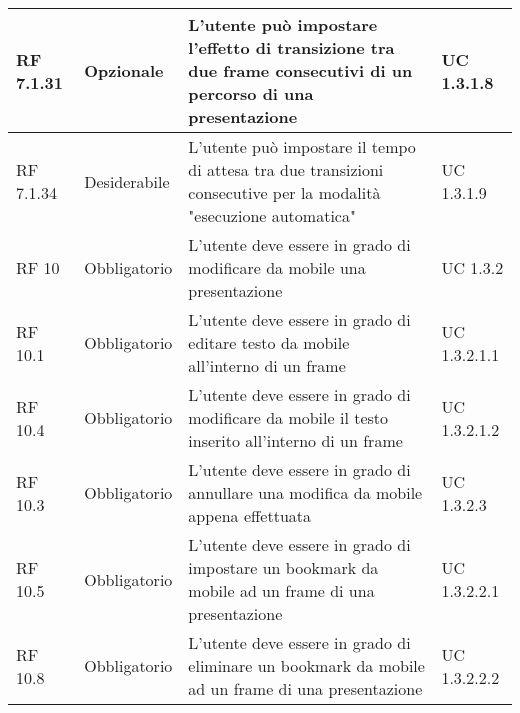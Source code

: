 {\begin{longtable} [c]{| p{2.5cm} | p{2.5cm} | p{6cm} |p{2.5cm}|}
			\hline
			RF 7.1.31 & Opzionale & L'utente può impostare l’effetto di transizione tra due frame\ped{g} consecutivi di un percorso\ped{g} di una presentazione & UC 1.3.1.8\\
			\hline
			RF 7.1.34 & Desiderabile & L'utente può impostare il tempo di attesa tra due transizioni consecutive per la modalità "esecuzione automatica" & UC 1.3.1.9\\
			\hline
			RF 10 & Obbligatorio & L'utente deve essere in grado di modificare da mobile una presentazione & UC 1.3.2\\
			\hline
			RF 10.1 & Obbligatorio & L'utente deve essere in grado di editare testo da mobile all'interno di un frame\ped{g} & UC 1.3.2.1.1\\
			\hline
			RF 10.4 & Obbligatorio & L'utente deve essere in grado di modificare da mobile il testo inserito all'interno di un frame\ped{g} & UC 1.3.2.1.2\\
			\hline
			RF 10.3 & Obbligatorio & L'utente deve essere in grado di annullare una modifica da mobile appena effettuata & UC 1.3.2.3\\
			\hline
			RF 10.5 & Obbligatorio & L'utente deve essere in grado di impostare un bookmark\ped{g} da mobile ad un frame\ped{g} di una presentazione & UC 1.3.2.2.1\\
			\hline
			RF 10.8 & Obbligatorio & L'utente deve essere in grado di eliminare un bookmark\ped{g} da mobile ad un frame\ped{g} di una presentazione & UC 1.3.2.2.2\\
			

\end{longtable}}
